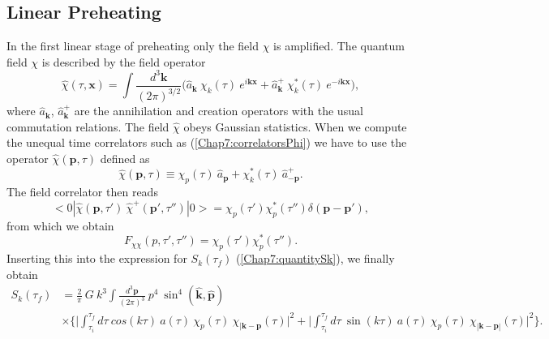 \documentclass[11pt,a4paper,twoside]{book}
\begin{document}
\subsection{Linear Preheating}
In the first linear stage of preheating only the field $\chi$ is amplified. The quantum field $\chi$ is described by the field operator
\begin{equation}
\label{Chap7:QuantumFieldChi}
\hat{\chi}(\tau,\textbf{x}) = \int \frac{d^{3}\textbf{k}}{(2\pi)^{3/2}} \Big(\hat{a}_{\textbf{k}}\ \chi_{k}(\tau)\ e^{i\textbf{k}\textbf{x}} + \hat{a}_{\textbf{k}}^{+}\ \chi_{k}^{*}(\tau)\  e^{-i\textbf{k}\textbf{x}}\Big ),
\end{equation}
where $ \hat{a}_{\textbf{k}} $, $\hat{a}_{\textbf{k}}^{+}  $ are the annihilation and creation operators with the usual commutation relations. The field $\hat{\chi}$ obeys Gaussian statistics. When we  compute the unequal time correlators such as (\ref{Chap7:correlatorsPhi}) we have to use the operator $\hat{\chi}(\textbf{p},\tau)$ defined as
\begin{equation}
\label{Chap7:fieldChiOperator}
\hat{\chi}(\textbf{p},\tau)\equiv \chi_{p}(\tau)\ \hat{a}_{\textbf{p}} + \chi_{k}^{*}(\tau)\ \hat{a}_{-\textbf{p}}^{+}.
\end{equation}
The field correlator then reads
\begin{equation}
\label{Chap7:fieldCorrelator}
<0|\hat{\chi}(\textbf{p},\tau')\ \hat{\chi}^{+}(\textbf{p}',\tau'')|0> = \chi_{p}(\tau ')\chi_{p}^{*}(\tau'')\delta(\textbf{p}-\textbf{p}'),
\end{equation}
from which we obtain
\begin{equation}
\label{Chap7:Fchichi}
F_{\chi\chi}(p,\tau',\tau '') = \chi_{p}(\tau')\chi_{p}^{*}(\tau'').
\end{equation}
Inserting this into the expression for $ S_{k}(\tau_{f}) $ (\ref{Chap7:quantitySk}),  we finally obtain
\begin{equation}
	\label{Chap7:quantitySk_preheating}
	\begin{split}
		S_{k}(\tau_{f}) & =\frac{2}{\pi}\ G\ k^{3}\int \frac{d^{3} \textbf{p}}{(2\pi)^{3}}\ p^{4}\ \sin^{4}(\hat{\textbf{k}},\hat{\textbf{p}}) \\
		& \times \Biggl\{\Bigg|\int_{\tau_{i}}^{\tau_{f}} d\tau\ cos(k\tau)\ a(\tau)\ \chi_{p}(\tau)\ \chi_{|\textbf{k}-\textbf{p}}(\tau)|^{2} + \Bigg|\int_{\tau_{i}}^{\tau_{f}} d\tau\ \sin(k\tau)\ a(\tau)\ \chi_{p}(\tau)\ \chi_{|\textbf{k}-\textbf{p}|}(\tau) \Bigg|^{2}    \Biggr\}.  
	\end{split}
\end{equation}
\end{document}
